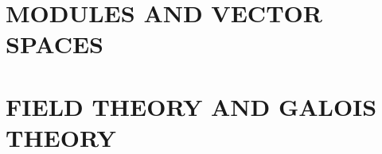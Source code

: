\documentclass[english, 11pt, a4paper]{book}
\begin{document}

\part{MODULES AND VECTOR SPACES}


\part{FIELD THEORY AND GALOIS THEORY}                       
 






\backmatter%
%
\printindex

\end{document}
